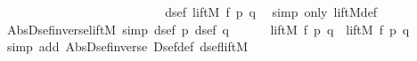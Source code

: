 \begin{isabellebody}
\ \ \ \ \ \ \ \ \isamarkupfalse%
\isanewline
\ \ \ \ \ \ \isamarkupfalse%
\isanewline
\ \ \ \ \isamarkupfalse%
\isanewline
\ \ \isamarkupfalse%
\isanewline
\ \ \isamarkupfalse%
\ {\isachardoublequote}dsef\ {\isacharparenleft}liftM{}\ f\ p\ q{\isacharparenright}{\isachardoublequote}\ \isamarkupfalse%
\ {\isacharparenleft}simp\ only{\isacharcolon}\ liftM{}{\isacharunderscore}def{\isacharparenright}\isanewline
\isamarkupfalse%
\isanewline
\isanewline
\isanewline
\isamarkupfalse%
\ Abs{\isacharunderscore}Dsef{\isacharunderscore}inverse{\isacharunderscore}liftM{}\ {\isacharbrackleft}simp{\isacharbrackright}{\isacharcolon}\ {\isachardoublequote}{\isasymlbrakk}dsef\ p{\isacharsemicolon}\ dsef\ q{\isasymrbrakk}\ {\isasymLongrightarrow}\ \isanewline
\ \ {\isasymDown}\ {\isacharparenleft}{\isasymUp}\ {\isacharparenleft}liftM{}\ f\ p\ q{\isacharparenright}{\isacharparenright}\ {\isacharequal}\ liftM{}\ f\ p\ q{\isachardoublequote}\isanewline
\isamarkupfalse%
\ {\isacharparenleft}simp\ add{\isacharcolon}\ Abs{\isacharunderscore}Dsef{\isacharunderscore}inverse\ Dsef{\isacharunderscore}def\ dsef{\isacharunderscore}liftM{}{\isacharparenright}\isanewline
\isanewline
\isanewline
\isamarkupfalse%
\isamarkupfalse%
\end{isabellebody}%
